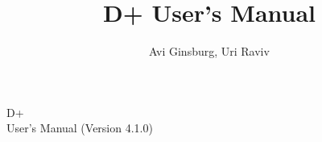 \documentclass[12pt,a4paper,openany,oneside,oldfontcommands]{memoir}
\author{Avi Ginsburg, Uri Raviv}
\title{D+ User's Manual}
\begin{document}
\frontmatter
\thispagestyle{empty} %
\vspace*{\fill}
\begin{center}
\HUGE D+ \\
\medskip
\Large User's Manual (Version 4.1.0)
\end{center}
\vspace*{\fill}

\newpage
\tableofcontents






\mainmatter






\begin{refsection}

\end{refsection}

\begin{refsection}

\end{refsection}











%

\nocite{*}
\printbibliography[]
\end{document}
